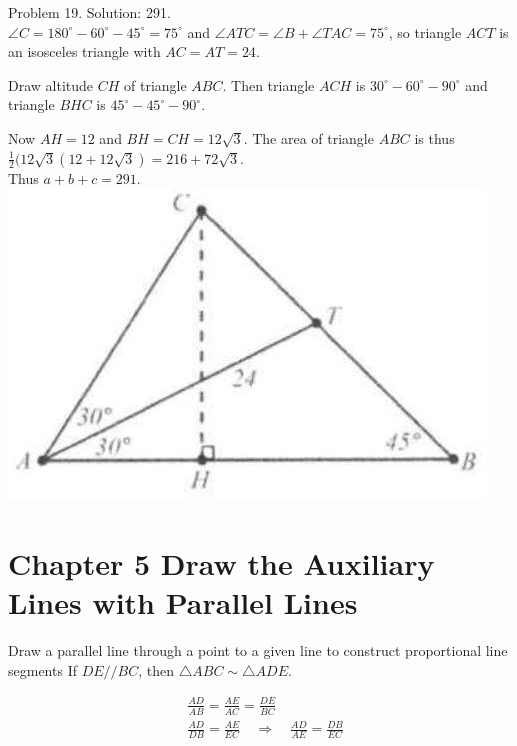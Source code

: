 \documentclass[10pt]{article}
\begin{document}
Problem 19. Solution: 291.\\
\(\angle C=180^{\circ}-60^{\circ}-45^{\circ}=75^{\circ}\) and \(\angle A T C=\angle B+\angle T A C=75^{\circ}\), so triangle \(A C T\) is an isosceles triangle with \(A C=A T=24\).

Draw altitude \(C H\) of triangle \(A B C\). Then triangle \(A C H\) is \(30^{\circ}-60^{\circ}-90^{\circ}\) and triangle \(B H C\) is \(45^{\circ}-45^{\circ}-90^{\circ}\).

Now \(A H=12\) and \(B H=C H=12 \sqrt{3}\). The area of triangle \(A B C\) is thus\\
\(\frac{1}{2}(12 \sqrt{3}(12+12 \sqrt{3})=216+72 \sqrt{3}\).\\
Thus \(a+b+c=291\).\\
\includegraphics[max width=\textwidth, center]{2025_04_17_97bc1f7e44d93c271a88g-100}

\section*{Chapter 5 Draw the Auxiliary Lines with Parallel Lines}
Draw a parallel line through a point to a given line to construct proportional line segments
If \(D E / / B C\), then \(\triangle A B C \sim \triangle A D E\).

\[
\begin{aligned}
& \frac{A D}{A B}=\frac{A E}{A C}=\frac{D E}{B C} \\
& \frac{A D}{D B}=\frac{A E}{E C} \quad \Rightarrow \quad \frac{A D}{A E}=\frac{D B}{E C}
\end{aligned}
\]
\end{document}
